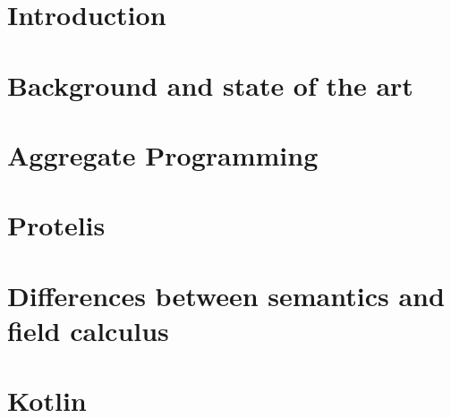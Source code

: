 



\clearpage\null\thispagestyle{empty}

\maketitle

\clearpage\null\thispagestyle{empty}

\tableofcontents

\chapter{Introduction}\label{chap:intro}



\chapter{Background and state of the art}\label{chap:history}



\chapter{Aggregate Programming}\label{chap:aggregate}



\chapter{Protelis}\label{chap:protelis}



\chapter{\Scafi{}}\label{chap:scafi}



\chapter{Differences between \Scafi{} semantics and field calculus}\label{chap:comparison}



\chapter{Kotlin}\label{chap:kotlin}

